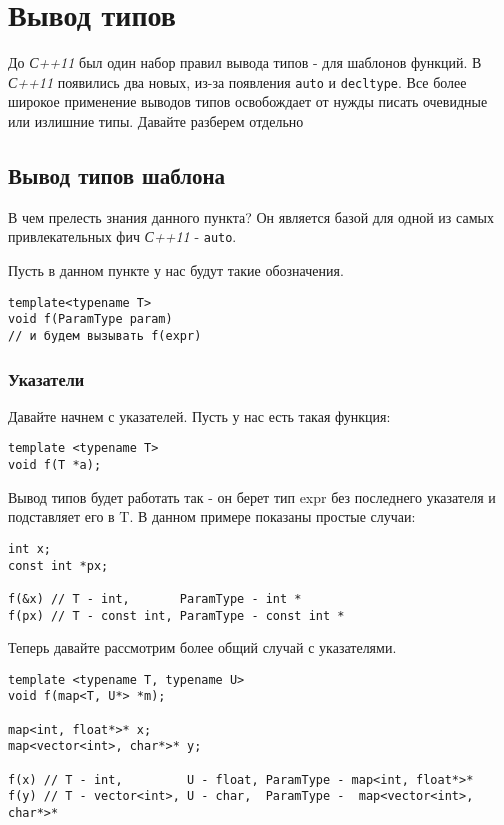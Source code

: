 	\section{Вывод типов}
	До \textit{С++11} был один набор правил вывода типов - для шаблонов функций. В \textit{С++11} появились два новых, из-за появления \texttt{auto} и \texttt{decltype}.
	Все более широкое применение выводов типов освобождает от нужды писать очевидные или излишние типы. Давайте разберем отдельно
	
	\subsection{Вывод типов шаблона}
		В чем прелесть знания данного пункта? Он является базой для одной из самых привлекательных фич \textit{С++11} - \texttt{auto}.
		
		Пусть в данном пункте у нас будут такие обозначения.
		
\begin{verbatim}
template<typename T>
void f(ParamType param)
// и будем вызывать f(expr)
\end{verbatim}

		\subsubsection{Указатели}
			Давайте начнем с указателей. Пусть у нас есть такая функция:
\begin{verbatim}
template <typename T>
void f(T *a);
\end{verbatim}
			
			Вывод типов будет работать так - он берет тип expr без последнего указателя и подставляет его в T. В данном примере показаны простые случаи:
\begin{verbatim}
int x;
const int *px;

f(&x) // T - int,       ParamType - int *
f(px) // T - const int, ParamType - const int *
\end{verbatim}
			
			Теперь давайте рассмотрим более общий случай с указателями.
\begin{verbatim}
template <typename T, typename U>
void f(map<T, U*> *m);

map<int, float*>* x;
map<vector<int>, char*>* y;

f(x) // T - int,         U - float, ParamType - map<int, float*>*
f(y) // T - vector<int>, U - char,  ParamType -  map<vector<int>, char*>*
\end{verbatim}
